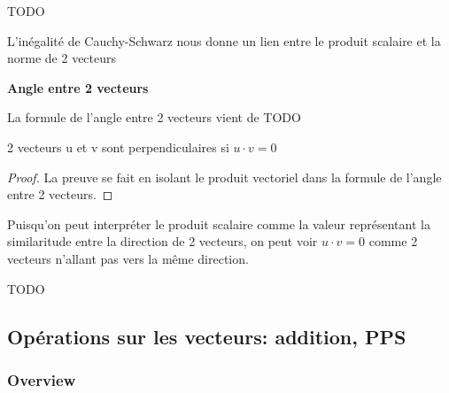 \documentclass{article}
\begin{document}
\begin{theorem}
    TODO
\end{theorem}

\begin{theorem}

\end{theorem}

\begin{remark}
    L'inégalité de Cauchy-Schwarz nous donne un lien entre le produit scalaire
    et la norme de 2 vecteurs
\end{remark}

\textbf{Angle entre 2 vecteurs}

\begin{definition}
\end{definition}

\begin{intuition}
    La formule de l'angle entre 2 vecteurs vient de TODO
\end{intuition}

\begin{theorem}
    2 vecteurs u et v sont perpendiculaires si $ u \cdot v = 0$
\end{theorem}

\begin{proof}
    La preuve se fait en isolant le produit vectoriel dans la formule de
    l'angle entre 2 vecteurs.
\end{proof}

\begin{intuition}
    Puisqu'on peut interpréter le produit scalaire comme la valeur représentant
    la similaritude entre la direction de 2 vecteurs, on peut voir
    $ u \cdot v = 0$ comme 2 vecteurs n'allant pas vers la même direction.
\end{intuition}

\begin{remark}
    TODO
\end{remark}

\subsection{Opérations sur les vecteurs: addition, PPS}

\subsubsection{Overview}%
\label{ssub:Overview}
\end{document}
